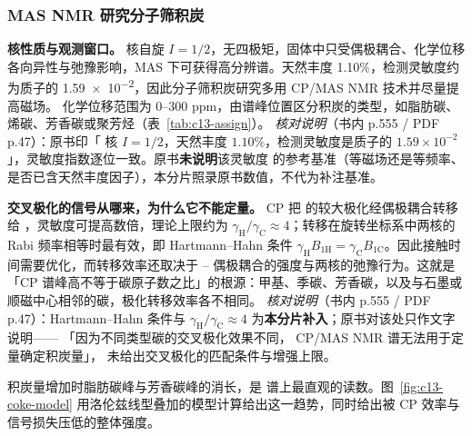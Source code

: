 \subsubsection{ MAS NMR 研究分子筛积炭}

\begin{principle}
\textbf{核性质与观测窗口。}  核自旋 $I=1/2$，无四极矩，固体中只受偶极耦合、化学位移各向异性与弛豫影响，MAS 下可获得高分辨谱。天然丰度 1.10\%，检测灵敏度约为质子的 \num{1.59e-2}，因此分子筛积炭研究多用  CP/MAS NMR 技术并尽量提高磁场。 化学位移范围为 0--300 ppm，由谱峰位置区分积炭的类型，如脂肪碳、烯碳、芳香碳或聚芳烃（表~\ref{tab:c13-assign}）。
\emph{核对说明}（书内 p.555 / PDF p.47）：原书印「 核 $I=1/2$，天然丰度
$1.10\%$，检测灵敏度是质子的 $1.59\times10^{-2}$」，灵敏度指数逐位一致。原书\textbf{未说明}该灵敏度
的参考基准（等磁场还是等频率、是否已含天然丰度因子），本分片照录原书数值，不代为补注基准。

\textbf{交叉极化的信号从哪来，为什么它不能定量。} CP 把  的较大极化经偶极耦合转移给 ，灵敏度可提高数倍，理论上限约为 $\gamma_{\mathrm{H}}/\gamma_{\mathrm{C}}\approx 4$；转移在旋转坐标系中两核的 Rabi 频率相等时最有效，即 Hartmann--Hahn 条件 $\gamma_{\mathrm{H}}B_{1\mathrm{H}}=\gamma_{\mathrm{C}}B_{1\mathrm{C}}$。因此接触时间需要优化，而转移效率还取决于 -- 偶极耦合的强度与两核的弛豫行为。这就是「CP 谱峰高不等于碳原子数之比」的根源：甲基、季碳、芳香碳，以及与石墨或顺磁中心相邻的碳，极化转移效率各不相同。
\emph{核对说明}（书内 p.555 / PDF p.47）：Hartmann--Hahn 条件与
$\gamma_{\mathrm{H}}/\gamma_{\mathrm{C}}\approx 4$ 为\textbf{本分片补入}；原书对该处只作文字说明——
「因为不同类型碳的交叉极化效果不同， CP/MAS NMR 谱无法用于定量确定积炭量」，
未给出交叉极化的匹配条件与增强上限。
\end{principle}

积炭量增加时脂肪碳峰与芳香碳峰的消长，是  谱上最直观的读数。图~\ref{fig:c13-coke-model} 用洛伦兹线型叠加的模型计算给出这一趋势，同时给出被 CP 效率与信号损失压低的整体强度。

